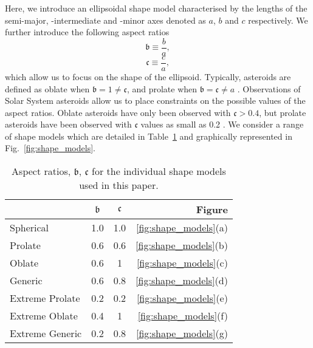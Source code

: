 \documentclass[fleqn,usenatbib]{mnras}
\begin{document}
Here, we introduce an ellipsoidal shape model characterised by the lengths of the semi-major, -intermediate and -minor axes denoted as $a$, $b$ and $c$ respectively. 
We further introduce the following aspect ratios 
\begin{equation}
    \mathfrak{b}  \equiv \frac{b}{a},
    \label{eq:b_ratio}
\end{equation}
\begin{equation}
    \mathfrak{c} \equiv \frac{c}{a},
    \label{eq:c_ratio}
\end{equation}
which allow us to focus on the shape of the ellipsoid.
Typically, asteroids are defined as oblate when $\mathfrak{b} = 1 \ne \mathfrak{c}$, and prolate when $\mathfrak{b} = \mathfrak{c} \ne a$ \citep{Holsapple2001}.
Observations of Solar System asteroids allow us to place constraints on the possible values of the aspect ratios.
Oblate asteroids have only been observed with $\mathfrak{c} > 0.4$, but prolate asteroids have been observed with $\mathfrak{c}$ values as small as 0.2 \citep{Zhang2020}. 
We consider a range of shape models which are detailed in Table~\ref{tab:ellip_shape_models} and graphically represented in Fig.~\ref{fig:shape_models}.
\begin{table}
	\centering
	\caption{Aspect ratios, $\mathfrak{b}$, $\mathfrak{c}$ for the individual shape models used in this paper.}
	\label{tab:ellip_shape_models}
	\begin{tabular}{lccr}
		\hline
		 & $\mathfrak{b}$ & $\mathfrak{c}$ & Figure\\
		\hline
		Spherical & 1.0 & 1.0 & \ref{fig:shape_models}(a)\\
		Prolate & 0.6 & 0.6 & \ref{fig:shape_models}(b)\\
		Oblate & 0.6 & 1 & \ref{fig:shape_models}(c)\\
		Generic & 0.6 & 0.8 & \ref{fig:shape_models}(d)\\
		Extreme Prolate & 0.2 & 0.2 & \ref{fig:shape_models}(e)\\
		Extreme Oblate & 0.4 & 1 & \ref{fig:shape_models}(f)\\
		Extreme Generic & 0.2 & 0.8 & \ref{fig:shape_models}(g)\\
		\hline
	\end{tabular}
\end{table}
\end{document}
